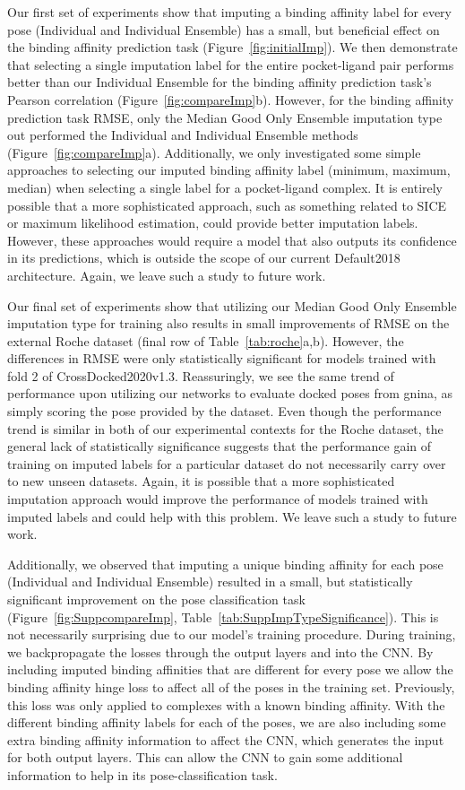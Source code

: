 \documentclass[journal=jcim,manuscript=article]{achemso}
\begin{document}
Our first set of experiments show that imputing a binding affinity label for every pose (Individual and Individual Ensemble) has a small, but beneficial effect on the binding affinity prediction task (Figure~\ref{fig:initialImp}).
We then demonstrate that selecting a single imputation label for the entire pocket-ligand pair performs better than our Individual Ensemble for the binding affinity prediction task's Pearson correlation (Figure~\ref{fig:compareImp}b).
However, for the binding affinity prediction task RMSE, only the Median Good Only Ensemble imputation type out performed the Individual and Individual Ensemble methods (Figure~\ref{fig:compareImp}a).
Additionally, we only investigated some simple approaches to selecting our imputed binding affinity label (minimum, maximum, median) when selecting a single label for a pocket-ligand complex.
It is entirely possible that a more sophisticated approach, such as something related to SICE\cite{SICE} or maximum likelihood estimation, could provide better imputation labels.
However, these approaches would require a model that also outputs its confidence in its predictions, which is outside the scope of our current Default2018 architecture.
Again, we leave such a study to future work.

Our final set of experiments show that utilizing our Median Good Only Ensemble imputation type for training also results in small improvements of RMSE on the external Roche dataset (final row of Table~\ref{tab:roche}a,b).
However, the differences in RMSE were only statistically significant for models trained with fold 2 of CrossDocked2020v1.3.
Reassuringly, we see the same trend of performance upon utilizing our networks to evaluate docked poses from gnina, as simply scoring the pose provided by the dataset.
Even though the performance trend is similar in both of our experimental contexts for the Roche dataset, the general lack of statistically significance suggests that the performance gain of training on imputed labels for a particular dataset do not necessarily carry over to new unseen datasets.
Again, it is possible that a more sophisticated imputation approach would improve the performance of models trained with imputed labels and could help with this problem.
We leave such a study to future work.

Additionally, we observed that imputing a unique binding affinity for each pose (Individual and Individual Ensemble) resulted in a small, but statistically significant improvement on the pose classification task (Figure~\ref{fig:SuppcompareImp}, Table~\ref{tab:SuppImpTypeSignificance}).
This is not necessarily surprising due to our model's training procedure.
During training, we backpropagate the losses through the output layers and into the CNN.
By including imputed binding affinities that are different for every pose we allow the binding affinity hinge loss to affect all of the poses in the training set.
Previously, this loss was only applied to complexes with a known binding affinity.
With the different binding affinity labels for each of the poses, we are also including some extra binding affinity information to affect the CNN, which generates the input for both output layers.
This can allow the CNN to gain some additional information to help in its pose-classification task.
\end{document}
